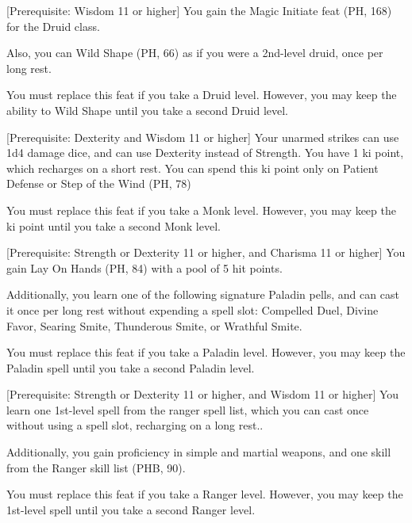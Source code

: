 \documentclass[letterpaper,twocolumn,openany,nodeprecatedcode,bg=print]{dndbook}
\begin{document}
[Prerequisite: Wisdom 11 or higher]
\label{druid-initiate}
You gain the Magic Initiate feat (PH, 168) for the Druid class.

Also, you can Wild Shape (PH, 66) as if you were a 2nd-level druid, once per long rest.

You must replace this feat if you take a Druid level. However, you may keep the ability to Wild Shape until you take a second Druid level.


[Prerequisite: Dexterity and Wisdom 11 or higher]
\label{monk-initiate}
Your unarmed strikes can use 1d4 damage dice, and can use Dexterity instead of Strength. 
You have 1 ki point, which recharges on a short rest. You can spend this ki point only on Patient Defense or Step of the Wind (PH, 78)

You must replace this feat if you take a Monk level. However, you may keep the ki point until you take a second Monk level.

[Prerequisite: Strength or Dexterity 11 or higher, and Charisma 11 or higher]
\label{paladin-initiate}
You gain Lay On Hands (PH, 84) with a pool of 5 hit points. 

Additionally, you learn one of the following signature Paladin pells, and can cast it once per long rest without expending a spell slot: Compelled Duel, Divine Favor, Searing Smite, Thunderous Smite, or Wrathful Smite. 

You must replace this feat if you take a Paladin level. However, you may keep the Paladin spell until you take a second Paladin level.

[Prerequisite: Strength or Dexterity 11 or higher, and Wisdom 11 or higher]
\label{ranger-initiate}
You learn one 1st-level spell from the ranger spell list, which you can cast once without using a spell slot, recharging on a long rest.. 

Additionally, you gain proficiency in simple and martial weapons, and one skill from the Ranger skill list (PHB, 90).

You must replace this feat if you take a Ranger level. However, you may keep the 1st-level spell until you take a second Ranger level.
\end{document}
